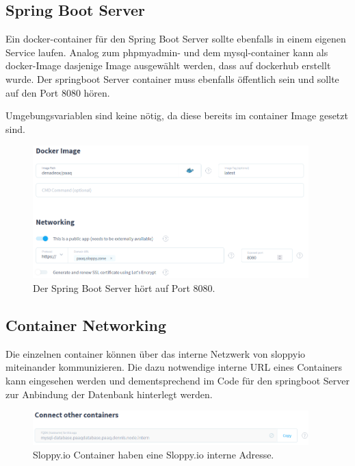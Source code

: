 \documentclass[../main.tex]{subfiles}
\begin{document}
	\subsection{Spring Boot Server}
	\par Ein \gls{docker}-\gls{container} für den Spring Boot Server sollte ebenfalls in einem eigenen Service laufen. Analog zum \gls{phpmyadmin}- und dem \gls{mysql}-\gls{container} kann als \gls{docker}-Image dasjenige Image ausgewählt werden, dass auf \gls{dockerhub} erstellt wurde. Der \gls{springboot} Server \gls{container} muss ebenfalls öffentlich sein und sollte auf den Port 8080 hören.
	\par Umgebungsvariablen sind keine nötig, da diese bereits im \gls{container} Image gesetzt sind.
	
	\begin{figure}[H]
		\centering
		\includegraphics[width=0.95\textwidth]{../images/SloppySpringServer} 
		\caption{Der Spring Boot Server hört auf Port 8080.}
		\label{fig:SloppySpringServer}
	\end{figure}
	
	\subsection{Container Networking}
	\par Die einzelnen \gls{container} können über das interne Netzwerk von \gls{sloppyio} miteinander kommunizieren. Die dazu notwendige interne URL eines Containers kann eingesehen werden und dementsprechend im Code für den \gls{springboot} Server zur Anbindung der Datenbank hinterlegt werden.
	\begin{figure}[H]
		\centering
		\includegraphics[width=0.95\textwidth]{../images/SloppyConnectContainers} 
		\caption{Sloppy.io Container haben eine Sloppy.io interne Adresse.}
		\label{fig:SloppyConnectContainers}
	\end{figure}
	
\end{document}
